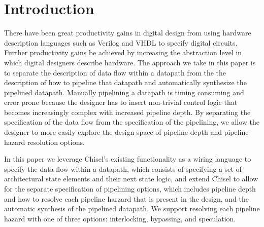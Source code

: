 \section{Introduction}
There have been great productivity gains in digital design from using hardware description languages such as Verilog and VHDL to specify digital circuits. Further productivity gains be achieved by increasing the abstraction level in which digital designers describe hardware. The approach we take in this paper is to separate the description of data flow within a datapath from the the description of how to pipeline that datapath and automatically synthesize the pipelined datapath. Manually pipelining a datapath is timing consuming and error prone because the designer has to insert non-trivial control logic that becomes increasingly complex with increased pipeline depth. By separating the specification of the data flow from the specification of the pipelining, we allow the designer to more easily explore the design space of pipeline depth and pipeline hazard resolution options. 

In this paper we leverage Chisel's existing functionality as a wiring language to specify the data flow within a datapath, which consists of specifying a set of architectural state elements and their next state logic, and extend Chisel to allow for the separate specification of pipelining options, which includes pipeline depth and how to resolve each pipeline harzard that is present in the design, and the automatic synthesis of the pipelined datapath. We support resolving each pipeline hazard with one of three options: interlocking, bypassing, and speculation.


\cite{Bachrach-2012}
